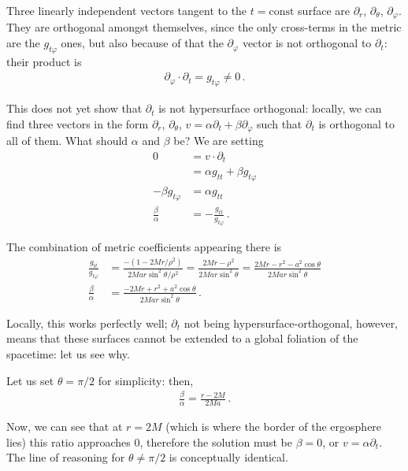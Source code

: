 \documentclass[main.tex]{subfiles}
\begin{document}
Three linearly independent vectors tangent to the \(t = \text{const}\) surface are \(\partial_r\), \(\partial_\theta \), \(\partial_\varphi \). 
They are orthogonal amongst themselves, since the only cross-terms in the metric are the \(g_{t \varphi }\) ones, but also because of that the \(\partial_\varphi \) vector is not orthogonal to \(\partial_t\): their product is %
\begin{align}
\partial_\varphi \cdot \partial_t = g_{t \varphi} \neq 0
\,.
\end{align}

This does not yet show that \(\partial_t\) is not hypersurface orthogonal: locally, we can find three vectors in the form \(\partial_r\), 
\(\partial_\theta \), \(v = \alpha \partial_t + \beta \partial_\varphi\) such that \(\partial_t\) is orthogonal to all of them. 
What should \(\alpha \) and \(\beta \) be? 
We are setting 
%
\begin{align}
0 &= v \cdot \partial_t \\
&= \alpha g_{tt} + \beta g_{t \varphi }  \\
- \beta g_{t \varphi } &= \alpha g_{tt}   \\
\frac{\beta }{\alpha} &= - \frac{ g_{t t }}{g_{t \varphi }}
\,.
\end{align}

The combination of metric coefficients appearing there is %
\begin{align}
\frac{g_{tt}}{g_{t \varphi }} &= 
\frac{- (1 - 2Mr / \rho^2)}{2Mar \sin^2 \theta / \rho^2} = \frac{2Mr - \rho^2}{2Mar \sin^2\theta } = \frac{2Mr - r^2 - a^2 \cos \theta }{2Mar \sin^2 \theta }  \\
\frac{\beta }{\alpha} &= \frac{ -2Mr + r^2 + a^2 \cos \theta}{2Mar \sin^2 \theta }
\,.
\end{align}

Locally, this works perfectly well; \(\partial_t\) not being hypersurface-orthogonal, however, 
means that these surfaces cannot be extended to a global foliation of the spacetime: let us see why. 

Let us set \(\theta = \pi /2\) for simplicity: then, 
%
\begin{align}
\frac{\beta }{\alpha} = \frac{r - 2M}{2Ma}
\,.
\end{align}

Now, we can see that at \(r = 2M\) (which is where the border of the ergosphere lies) this ratio approaches 0, therefore the 
solution must be \(\beta = 0\), or \(v = \alpha \partial_t\).
The line of reasoning for \(\theta \neq \pi /2 \) is conceptually identical.
\end{document}

